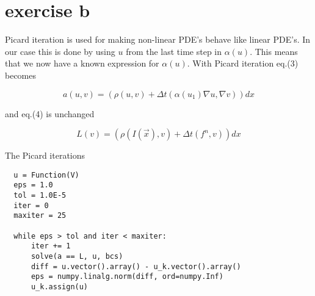 \section{exercise b}

Picard iteration is used for making non-linear PDE's behave like linear PDE's. In our case this is done by using $u$ from the last time step in $\alpha(u)$. 
This means that we now have a known expression for $\alpha(u)$. With Picard iteration eq.(3) becomes

\begin{equation}
  a(u,v) = (\rho(u,v) + \Delta t (\alpha(u_1) \nabla u,\nabla v))dx
\end{equation}

and eq.(4) is unchanged

\begin{equation}
 L(v) = (\rho(I(\vec{x}),v)  + \Delta t(f^n,v))dx
\end{equation}



The Picard iterations 

\begin{lstlisting}
  u = Function(V)
  eps = 1.0
  tol = 1.0E-5
  iter = 0
  maxiter = 25
  
  while eps > tol and iter < maxiter:
      iter += 1
      solve(a == L, u, bcs)
      diff = u.vector().array() - u_k.vector().array()
      eps = numpy.linalg.norm(diff, ord=numpy.Inf)
      u_k.assign(u)
\end{lstlisting}